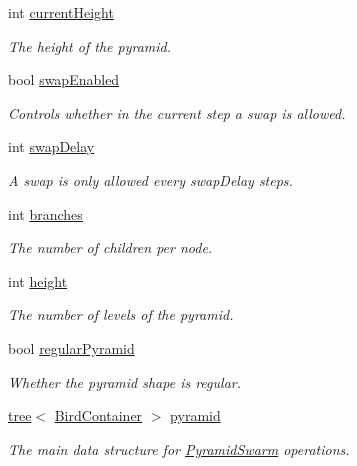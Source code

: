 \begin{CompactItemize}
\item 
int \hyperlink{classPyramidSwarm_99413b13720853105b55ee3c340f7e54}{currentHeight}
\begin{CompactList}\small\item\em The height of the pyramid. \item\end{CompactList}\item 
bool \hyperlink{classPyramidSwarm_e041e1a1e5cd917273c713186d8f3b99}{swapEnabled}
\begin{CompactList}\small\item\em Controls whether in the current step a swap is allowed. \item\end{CompactList}\item 
int \hyperlink{classPyramidSwarm_b45f85f201faea37d41695fe4d3cae04}{swapDelay}
\begin{CompactList}\small\item\em A swap is only allowed every swapDelay steps. \item\end{CompactList}\item 
int \hyperlink{classPyramidSwarm_b60c66cd8c7437c9b9abb2016a65e824}{branches}
\begin{CompactList}\small\item\em The number of children per node. \item\end{CompactList}\item 
int \hyperlink{classPyramidSwarm_147496f1f506ee3f2e82cadc9c235baf}{height}
\begin{CompactList}\small\item\em The number of levels of the pyramid. \item\end{CompactList}\item 
bool \hyperlink{classPyramidSwarm_5e4c75c3e9a876d96c6a0ae4b32492d5}{regularPyramid}
\begin{CompactList}\small\item\em Whether the pyramid shape is regular. \item\end{CompactList}\item 
\hyperlink{classtree}{tree}$<$ \hyperlink{structBirdContainer}{BirdContainer} $>$ \hyperlink{classPyramidSwarm_5d0a3d52d9ae04a4d1542e7977b6464d}{pyramid}
\begin{CompactList}\small\item\em The main data structure for \hyperlink{classPyramidSwarm}{PyramidSwarm} operations. \item\end{CompactList}\item 

\end{CompactItemize}
